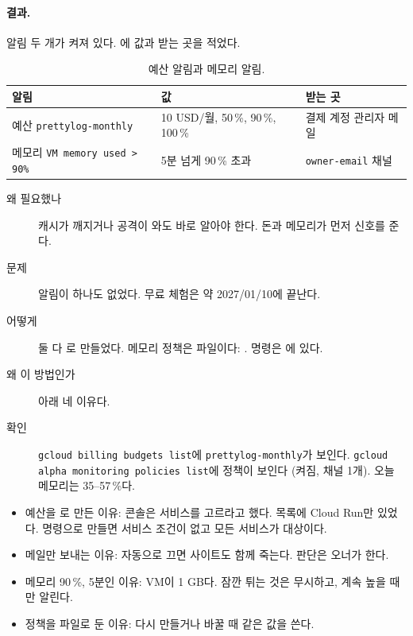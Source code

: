 \paragraph{결과.}
알림 두 개가 켜져 있다.
에 값과 받는 곳을 적었다.

\begin{table}[H]
  \caption{예산 알림과 메모리 알림.}\label{tab:06-alerts}
  \small
  \begin{tabularx}{\linewidth}{L{4.6cm} Y Y}
    \toprule
    알림 & 값 & 받는 곳 \\
    \midrule
    예산 \texttt{prettylog-monthly} & 10 USD/월, 50\,\%, 90\,\%, 100\,\% & 결제 계정 관리자 메일 \\
    \midrule
    메모리 \texttt{VM memory used > 90\%} & 5분 넘게 90\,\% 초과 & \texttt{owner-email} 채널 \\
    \bottomrule
  \end{tabularx}
\end{table}

\begin{description}
  \item[왜 필요했나] 캐시가 깨지거나 공격이 와도 바로 알아야 한다. 돈과 메모리가 먼저 신호를 준다.
  \item[문제] 알림이 하나도 없었다. 무료 체험은 약 2027/01/10에 끝난다.
  \item[어떻게] 둘 다 로 만들었다. 메모리 정책은 파일이다: . 명령은 에 있다.
  \item[왜 이 방법인가] 아래 네 이유다.
  \item[확인] \texttt{gcloud billing budgets list}에 \texttt{prettylog-monthly}가 보인다. \texttt{gcloud alpha monitoring policies list}에 정책이 보인다 (켜짐, 채널 1개). 오늘 메모리는 35--57\,\%다.
\end{description}

\begin{itemize}[nosep]
  \item 예산을 로 만든 이유: 콘솔은 서비스를 고르라고 했다. 목록에 Cloud Run만 있었다. 명령으로 만들면 서비스 조건이 없고 모든 서비스가 대상이다.
  \item 메일만 보내는 이유: 자동으로 끄면 사이트도 함께 죽는다. 판단은 오너가 한다.
  \item 메모리 90\,\%, 5분인 이유: VM이 1 GB다. 잠깐 튀는 것은 무시하고, 계속 높을 때만 알린다.
  \item 정책을 파일로 둔 이유: 다시 만들거나 바꿀 때 같은 값을 쓴다.
\end{itemize}

